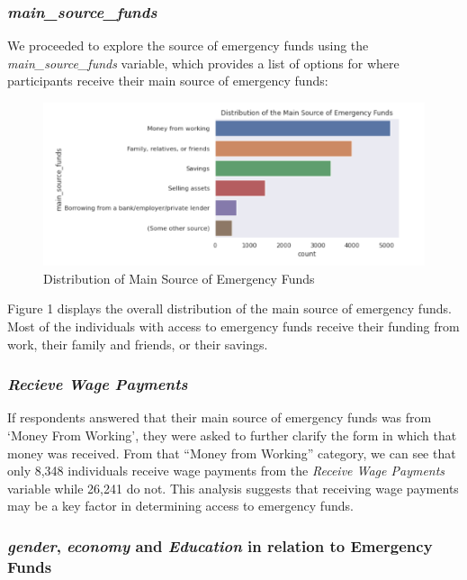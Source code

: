 \documentclass[water,article,submit,moreauthors,pdftex]{mdpi}
\begin{document}
\hypertarget{main_source_funds}{%
\subsubsection{\texorpdfstring{\emph{main\_source\_funds}}{main\_source\_funds}}\label{main_source_funds}}

We proceeded to explore the source of emergency funds using the
\emph{main\_source\_funds} variable, which provides a list of options
for where participants receive their main source of emergency funds:

\begin{figure}
\centering
\includegraphics[width=\textwidth,height=0.5\textheight]{images/MainSourceFunds.png}
\caption{Distribution of Main Source of Emergency Funds}
\end{figure}

Figure 1 displays the overall distribution of the main source of
emergency funds. Most of the individuals with access to emergency funds
receive their funding from work, their family and friends, or their
savings.

\hypertarget{recieve-wage-payments}{%
\subsubsection{\texorpdfstring{\emph{Recieve Wage
Payments}}{Recieve Wage Payments}}\label{recieve-wage-payments}}

If respondents answered that their main source of emergency funds was
from `Money From Working', they were asked to further clarify the form
in which that money was received. From that ``Money from Working''
category, we can see that only 8,348 individuals receive wage payments
from the \emph{Receive Wage Payments} variable while 26,241 do not. This
analysis suggests that receiving wage payments may be a key factor in
determining access to emergency funds.

\hypertarget{gender-economy-and-education-in-relation-to-emergency-funds}{%
\subsubsection{\texorpdfstring{\emph{gender}, \emph{economy} and
\emph{Education} in relation to Emergency
Funds}{gender, economy and Education in relation to Emergency Funds}}\label{gender-economy-and-education-in-relation-to-emergency-funds}}
\end{document}
